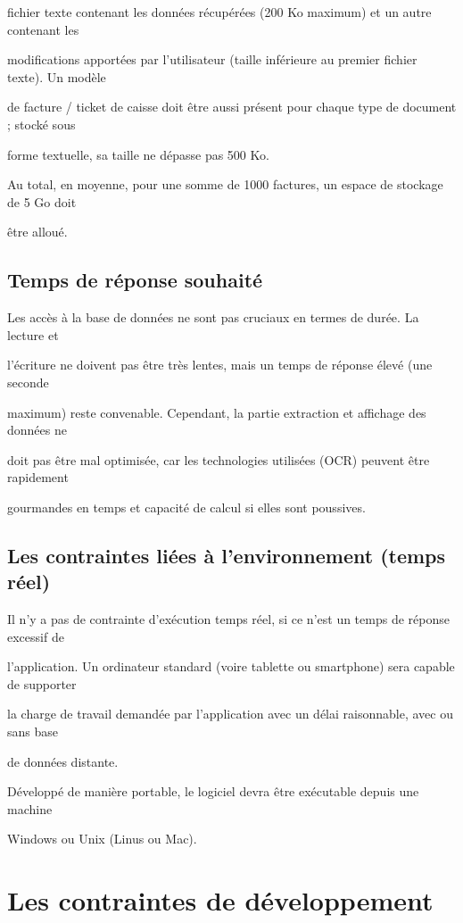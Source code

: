 \documentclass[a4paper,10pt]{article}
\begin{document}
fichier texte contenant les données récupérées (200 Ko maximum) et un autre contenant les 

modifications apportées par l’utilisateur (taille inférieure au premier fichier texte). Un modèle 

de facture / ticket de caisse doit être aussi présent pour chaque type de document ; stocké sous 

forme textuelle, sa taille ne dépasse pas 500 Ko.

Au total, en moyenne, pour une somme de 1000 factures, un espace de stockage de 5 Go doit 

être alloué.

\subsection{Temps de réponse souhaité}

Les accès à la base de données ne sont pas cruciaux en termes de durée. La lecture et 

l’écriture ne doivent pas être très lentes, mais un temps de réponse élevé (une seconde 

maximum) reste convenable. Cependant, la partie extraction et affichage des données ne 

doit pas être mal optimisée, car les technologies utilisées (OCR) peuvent être rapidement 

gourmandes en temps et capacité de calcul si elles sont poussives.

\subsection{Les contraintes liées à l'environnement (temps réel)}

Il n’y a pas de contrainte d’exécution temps réel, si ce n’est un temps de réponse excessif de 

l’application. Un ordinateur standard (voire tablette ou smartphone) sera capable de supporter 

la charge de travail demandée par l’application avec un délai raisonnable, avec ou sans base 

de données distante.

Développé de manière portable, le logiciel devra être exécutable depuis une machine 

Windows ou Unix (Linus ou Mac).

\section{ Les contraintes de développement}
\end{document}
